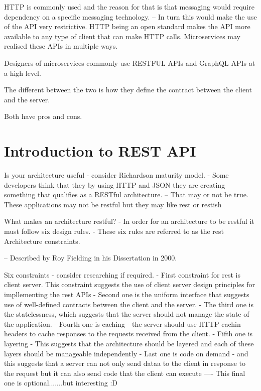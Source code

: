 \documentclass[a4paper, 11pt]{book}
\begin{document}
    HTTP is commonly used and the reason for that is that messaging would require dependency on a specific messaging technology.
    -- In turn this would make the use of the API very restrictive.
    HTTP being an open standard makes the API more available to any type of client that can make HTTP calls.
    Microservices may realised these APIs in multiple ways.

    Designers of microservices commonly use RESTFUL APIs and GraphQL APIs at a high level.

    The different between the two is how they define the contract between the client and the server.

    Both have pros and cons.


    \section{Introduction to REST API}

    Is your architecture useful - consider Richardson maturity model.
    - Some developers think that they by using HTTP and JSON they are creating something that qualifies as a RESTful architecture.
    -- That may or not be true.
    These applications may not be restful but they may like rest or restish

    What makes an architecture restful?
    - In order for an architecture to be restful it must follow six design rules.
    - These six rules are referred to as the rest Architecture constraints.

    -- Described by Roy Fielding in his Dissertation in 2000.

    Six constraints - consider researching if required.
    - First constraint for rest is client server. This constraint suggests the use of client server design principles for impllementing the rest APIs
    - Second one is the uniform interface that suggests use of well-defined contracts between the client and the server.
    - The third one is the statelessness, which suggests that the server should not manage the state of the application.
    - Fourth one is caching - the server should use HTTP cachin headers to cache responses to the requests received from the client.
    - Fifth one is layering - This suggests that the architecture should be layered and each of these layers should be manageable independently
    - Last one is code on demand - and this suggests that a server can not only send dataa to the client in response to the request but it can also send code that the client can execute
    ---- This final one is optional.......but interesting :D
\end{document}
